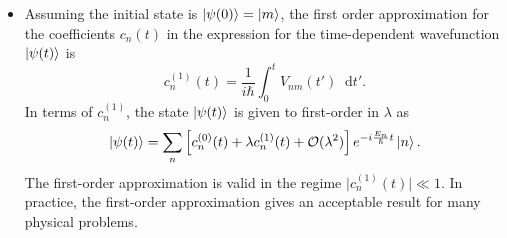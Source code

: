 \documentclass[11pt, a4paper]{article}
\newcommand{\diff}{\mathop{}\!\mathrm{d}} %
\begin{document}
\begin{itemize}
    \item Assuming the initial state is $ \ket{\psi(0)} = \ket{m} $, the first order approximation for the coefficients $ c_{n}(t) $ in the expression for the time-dependent wavefunction $ \ket{\psi(t)} $ is
    \begin{equation*}
        c_{n}^{(1)}(t) = \frac{1}{i \hbar} \int_{0}^{t}V_{nm}(t')\diff t'.
    \end{equation*}
    In terms of $ c_{n}^{(1)} $, the state $ \ket{\psi(t)} $ is given to first-order in $ \lambda $ as
    \begin{equation*}
        \ket{\psi(t)} = \sum_{n}\left[ c_{n}^{(0)}(t) + \lambda c_{n}^{(1)}(t) + \mathcal{O}(\lambda^{2})\right]e^{-i \frac{E_{n}}{\hbar}t}\ket{n}.
    \end{equation*}
    The first-order approximation is valid in the regime $ \big| c_{n}^{(1)}(t) \big| \ll 1 $. In practice, the first-order approximation gives an acceptable result for many physical problems.
    


\end{itemize}
\end{document}

